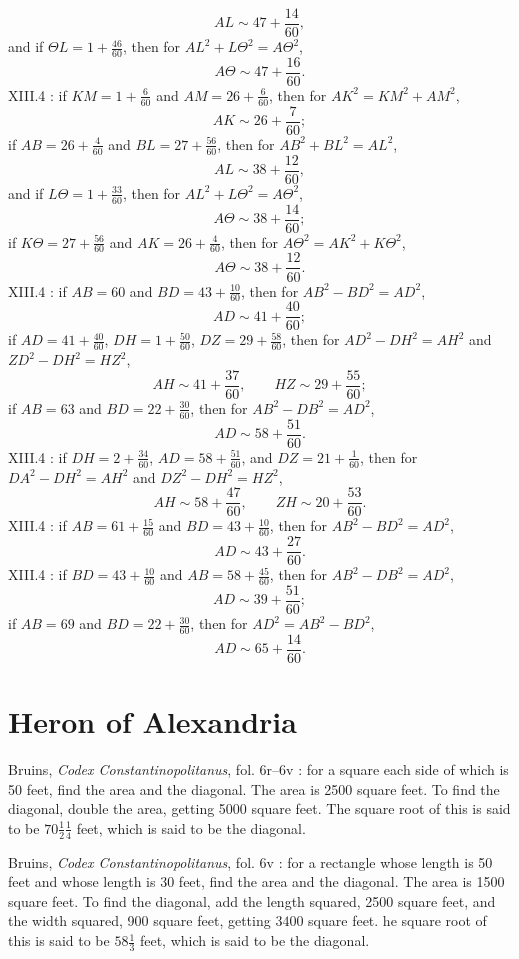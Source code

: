 \documentclass{article}
\theoremstyle{definition}
\begin{document}
\[
AL \sim 47+\frac{14}{60},
\]
and if $\Theta L = 1+\frac{46}{60}$, then for $AL^2+L\Theta^2=A\Theta^2$,
\[
A\Theta \sim 47+\frac{16}{60}.
\]
XIII.4 \cite[p.~621]{almagest}: if $KM=1+\frac{6}{60}$ and $AM=26+\frac{6}{60}$, then for $AK^2=KM^2+AM^2$,
\[
AK \sim 26+\frac{7}{60};
\]
if $AB=26+\frac{4}{60}$ and $BL=27+\frac{56}{60}$, then for $AB^2+BL^2=AL^2$,
\[
AL \sim 38+\frac{12}{60},
\]
and if $L\Theta = 1+\frac{33}{60}$, then for $AL^2+L\Theta^2=A\Theta^2$,
\[
A\Theta \sim 38+\frac{14}{60};
\]
if $K\Theta = 27+\frac{56}{60}$ and $AK=26+\frac{4}{60}$, then for $A\Theta^2=AK^2+K\Theta^2$,
\[
A\Theta \sim 38+\frac{12}{60}.
\]
XIII.4 \cite[p.~626]{almagest}: if $AB=60$ and $BD=43+\frac{10}{60}$, then for $AB^2-BD^2=AD^2$,
\[
AD \sim 41+\frac{40}{60};
\]
if $AD=41+\frac{40}{60}$, $DH=1+\frac{50}{60}$, $DZ=29+\frac{58}{60}$,
then for $AD^2-DH^2=AH^2$ and $ZD^2-DH^2=HZ^2$,
\[
AH \sim 41+\frac{37}{60},\qquad HZ \sim 29+\frac{55}{60};
\]
if $AB=63$ and $BD=22+\frac{30}{60}$, then for $AB^2-DB^2=AD^2$,
\[
AD \sim 58+\frac{51}{60}.
\]
XIII.4 \cite[p.~627]{almagest}: if $DH=2+\frac{34}{60}$, $AD=58+\frac{51}{60}$, and
$DZ=21+\frac{1}{60}$, then for $DA^2-DH^2=AH^2$ and $DZ^2-DH^2=HZ^2$,
\[
AH \sim 58+\frac{47}{60},\qquad ZH \sim 20+\frac{53}{60}.
\]
XIII.4 \cite[p.~628]{almagest}: if $AB=61+\frac{15}{60}$ and $BD=43+\frac{10}{60}$, then for $AB^2-BD^2=AD^2$,
\[
AD \sim 43+\frac{27}{60}.
\]
XIII.4 \cite[p.~629]{almagest}: if $BD=43+\frac{10}{60}$ and $AB=58+\frac{45}{60}$, then for $AB^2-DB^2=AD^2$,
\[
AD \sim 39+\frac{51}{60};
\]
if $AB=69$ and $BD=22+\frac{30}{60}$, then for $AD^2=AB^2-BD^2$,
\[
AD \sim 65+\frac{14}{60}.
\]









\section{Heron of Alexandria}
Bruins, {\em Codex Constantinopolitanus}, fol. 6r--6v \cite[p.~6]{constantinopolitanus}: 
for a square each side of which is 50 feet, find the area and the diagonal. The area is 2500 square feet.
To find the diagonal, double the area, getting 5000 square feet. 
The square root of this is said to be $70 \frac{1}{2} \frac{1}{4}$ feet, which is said to be the diagonal.
 
Bruins, {\em Codex Constantinopolitanus}, fol. 6v \cite[p.~6]{constantinopolitanus}: for a rectangle whose length is 50 feet and whose
length is 30 feet, find the area and the diagonal.
The area is 1500 square feet. To find the diagonal, add the length squared, 2500 square feet,
and the width squared, 900 square feet, getting $3400$ square feet. he square root of this is said to be
$58 \frac{1}{3}$ feet, which is said to be the diagonal.
\end{document}
